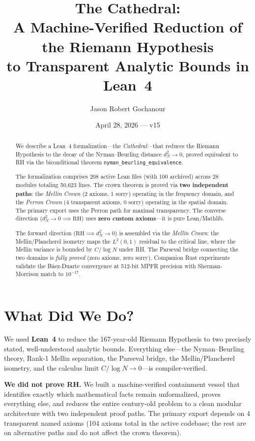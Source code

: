 \documentclass[12pt,a4paper]{article}
\title{%
  The Cathedral:\\[4pt]
  \large A Machine-Verified Reduction of the Riemann Hypothesis\\[2pt]
  \large to Transparent Analytic Bounds in Lean~4%
}
\author{Jason Robert Gochanour}
\date{April 28, 2026 --- v15}
\begin{document}
\maketitle

\begin{abstract}
We describe a Lean~4 formalization---the \emph{Cathedral}---that reduces
the Riemann Hypothesis to the decay of the Nyman--Beurling distance
$d_N^2 \to 0$, proved equivalent to RH via the biconditional theorem
\texttt{nyman\_beurling\_equivalence}.

The formalization comprises 208 active Lean files
(with 100 archived) across 28 modules totaling 50{,}623 lines.
The crown theorem is proved via \textbf{two independent paths}:
the \emph{Mellin Crown} (2 axioms, 1 sorry) operating in the
frequency domain, and the \emph{Perron Crown} (4 transparent axioms,
0 sorry) operating in the spatial domain. The primary export uses
the Perron path for maximal transparency.
The converse direction ($d_N^2 \to 0 \implies \mathrm{RH}$) uses
\textbf{zero custom axioms}---it is pure Lean/Mathlib.

The forward direction ($\mathrm{RH} \implies d_N^2 \to 0$) is assembled
via the \emph{Mellin Crown}: the Mellin/Plancherel isometry maps the
$L^2(0,1)$ residual to the critical line, where the Mellin variance is
bounded by $C/\log N$ under RH. The Parseval bridge connecting the two
domains is \emph{fully proved} (zero axioms, zero sorry).
Companion Rust experiments validate the B\'aez-Duarte convergence
at 512-bit MPFR precision with Sherman-Morrison match to $10^{-17}$.
\end{abstract}

\section{What Did We Do?}

We used \textbf{Lean~4} to reduce the 167-year-old Riemann Hypothesis
to two precisely stated, well-understood analytic bounds. Everything
else---the Nyman--Beurling theory,
Rank-1 Mellin separation, the Parseval bridge, the Mellin/Plancherel
isometry, and the calculus limit $C/\log N \to 0$---is compiler-verified.

\textbf{We did not prove RH.} We built a machine-verified containment
vessel that identifies exactly which mathematical facts remain unformalized,
proves everything else, and reduces the entire century-old problem to
a clean modular architecture with two independent proof paths.
The primary export depends on 4 transparent named axioms
(104 axioms total in the active codebase;
the rest are on alternative paths and do not affect the crown theorem).
\end{document}

